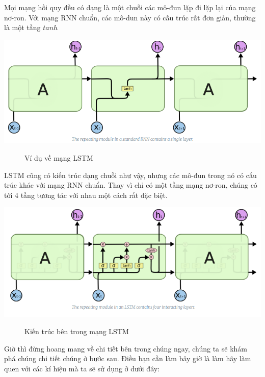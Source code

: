 Mọi mạng hồi quy đều có dạng là một chuỗi các mô-đun lặp đi lặp lại của mạng nơ-ron. Với mạng RNN chuẩn, các mô-dun này có cấu trúc rất đơn giản, thường là một tầng $tanh$
\begin{center}
    \includegraphics[scale=.3]{image/chapter6/lstm1.png}
    \begin{figure}[htp]
    \begin{center}
    \end{center}
    \caption{Ví dụ về mạng LSTM}
    \end{figure}
\end{center}
LSTM cũng có kiến trúc dạng chuỗi như vậy, nhưng các mô-đun trong nó có cấu trúc khác với mạng RNN chuẩn. Thay vì chỉ có một tầng mạng nơ-ron, chúng có tới 4 tầng tương tác với nhau một cách rất đặc biệt.
\begin{center}
    \includegraphics[scale=.3]{image/chapter6/lstm2.png}
    \begin{figure}[htp]
    \begin{center}
     
    \end{center}
    \caption{Kiến trúc bên trong mạng LSTM}
    \end{figure}
\end{center}
Giờ thì đừng hoang mang về chi tiết bên trong chúng ngay, chúng ta sẽ khám phá chúng chi tiết chúng ở bước sau. Điều bạn cần làm bây giờ là làm hãy làm quen với các kí hiệu mà ta sẽ sử dụng ở dưới đây:
